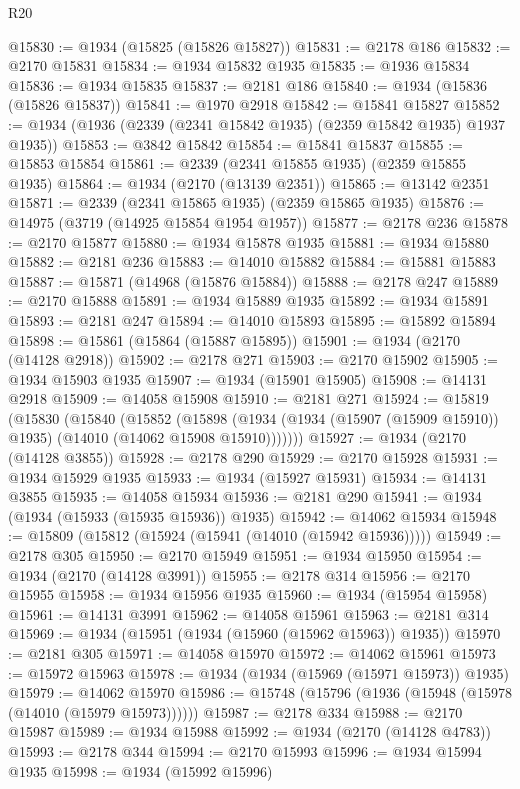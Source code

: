 \begin{lexlean}{R20}
\begin{coremodule}
@15830 := @1934 (@15825 (@15826 @15827))
@15831 := @2178 @186
@15832 := @2170 @15831
@15834 := @1934 @15832 @1935
@15835 := @1936 @15834
@15836 := @1934 @15835
@15837 := @2181 @186
@15840 := @1934 (@15836 (@15826 @15837))
@15841 := @1970 @2918
@15842 := @15841 @15827
@15852 := @1934 (@1936 (@2339 (@2341 @15842 @1935) (@2359 @15842 @1935) @1937 @1935))
@15853 := @3842 @15842
@15854 := @15841 @15837
@15855 := @15853 @15854
@15861 := @2339 (@2341 @15855 @1935) (@2359 @15855 @1935)
@15864 := @1934 (@2170 (@13139 @2351))
@15865 := @13142 @2351
@15871 := @2339 (@2341 @15865 @1935) (@2359 @15865 @1935)
@15876 := @14975 (@3719 (@14925 @15854 @1954 @1957))
@15877 := @2178 @236
@15878 := @2170 @15877
@15880 := @1934 @15878 @1935
@15881 := @1934 @15880
@15882 := @2181 @236
@15883 := @14010 @15882
@15884 := @15881 @15883
@15887 := @15871 (@14968 (@15876 @15884))
@15888 := @2178 @247
@15889 := @2170 @15888
@15891 := @1934 @15889 @1935
@15892 := @1934 @15891
@15893 := @2181 @247
@15894 := @14010 @15893
@15895 := @15892 @15894
@15898 := @15861 (@15864 (@15887 @15895))
@15901 := @1934 (@2170 (@14128 @2918))
@15902 := @2178 @271
@15903 := @2170 @15902
@15905 := @1934 @15903 @1935
@15907 := @1934 (@15901 @15905)
@15908 := @14131 @2918
@15909 := @14058 @15908
@15910 := @2181 @271
@15924 := @15819
    (@15830
      (@15840
        (@15852
          (@15898 (@1934 (@1934 (@15907 (@15909 @15910)) @1935) (@14010 (@14062 @15908 @15910)))))))
@15927 := @1934 (@2170 (@14128 @3855))
@15928 := @2178 @290
@15929 := @2170 @15928
@15931 := @1934 @15929 @1935
@15933 := @1934 (@15927 @15931)
@15934 := @14131 @3855
@15935 := @14058 @15934
@15936 := @2181 @290
@15941 := @1934 (@1934 (@15933 (@15935 @15936)) @1935)
@15942 := @14062 @15934
@15948 := @15809 (@15812 (@15924 (@15941 (@14010 (@15942 @15936)))))
@15949 := @2178 @305
@15950 := @2170 @15949
@15951 := @1934 @15950
@15954 := @1934 (@2170 (@14128 @3991))
@15955 := @2178 @314
@15956 := @2170 @15955
@15958 := @1934 @15956 @1935
@15960 := @1934 (@15954 @15958)
@15961 := @14131 @3991
@15962 := @14058 @15961
@15963 := @2181 @314
@15969 := @1934 (@15951 (@1934 (@15960 (@15962 @15963)) @1935))
@15970 := @2181 @305
@15971 := @14058 @15970
@15972 := @14062 @15961
@15973 := @15972 @15963
@15978 := @1934 (@1934 (@15969 (@15971 @15973)) @1935)
@15979 := @14062 @15970
@15986 := @15748 (@15796 (@1936 (@15948 (@15978 (@14010 (@15979 @15973))))))
@15987 := @2178 @334
@15988 := @2170 @15987
@15989 := @1934 @15988
@15992 := @1934 (@2170 (@14128 @4783))
@15993 := @2178 @344
@15994 := @2170 @15993
@15996 := @1934 @15994 @1935
@15998 := @1934 (@15992 @15996)

\end{coremodule}
\end{lexlean}
